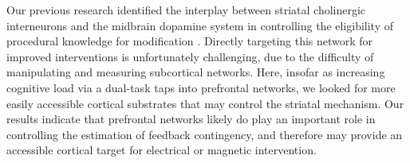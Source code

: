 \documentclass[man,apacite,draftfirst]{apa6}
\begin{document}
Our previous research identified the interplay between striatal cholinergic
interneurons and the midbrain dopamine system in controlling the eligibility of
procedural knowledge for modification \cite{crossley_erasing_2013}. Directly
targeting this network for improved interventions is unfortunately challenging,
due to the difficulty of manipulating and measuring subcortical networks. Here,
insofar as increasing cognitive load via a dual-task taps into prefrontal
networks, we looked for more easily accessible cortical substrates that may
control the striatal mechanism. Our results indicate that prefrontal networks
likely do play an important role in controlling the estimation of feedback
contingency, and therefore may provide an accessible cortical target for
electrical or magnetic intervention.


\end{document}
